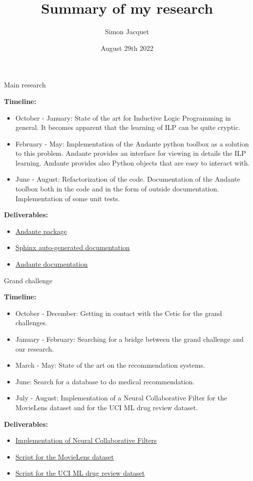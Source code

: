\documentclass{beamer}
\title{Summary of my research}
\author{Simon Jacquet}
\date{August 29th 2022}
\begin{document}
\frame{\titlepage}

\begin{frame}{Main research}

\textbf{Timeline:}
\begin{itemize}
\item October - January: State of the art for Inductive Logic Programming in
general. It becomes apparent that the learning of ILP can be quite cryptic.
\item February - May: Implementation of the Andante python toolbox as a
solution to this problem. Andante provides an interface for viewing in details
the ILP learning. Andante provides also Python objects that are easy to
interact with. 
\item June - August: Refactorization of the code. Documentation of the Andante
toolbox both in the code and in the form of outside documentation.
Implementation of some unit tests.
\end{itemize}

\textbf{Deliverables:}
\begin{itemize}
\item \href{https://gitlab.unamur.be/sijacque/andante/-/tree/master/src}{Andante package}
\item \href{https://gitlab.unamur.be/sijacque/andante/-/tree/master/docs}{Sphinx auto-generated documentation}
\item \href{https://gitlab.unamur.be/sijacque/andante-documentation}{Andante documentation}
\end{itemize}
\end{frame}

\begin{frame}{Grand challenge}

\textbf{Timeline:}
\begin{itemize}
\item October - December: Getting in contact with the Cetic for the grand
    challenges.
\item January - February: Searching for a bridge between the grand challenge
    and our research.
\item March - May: State of the art on the recommendation systems.
\item June: Search for a database to do medical recommendation.
\item July - August: Implementation of a Neural Collaborative Filter for the
    MovieLens dataset and for the UCI ML drug review dataset.
\end{itemize}

\textbf{Deliverables:}
\begin{itemize}
\item \href{https://gitlab.unamur.be/sijacque/fl-ncf/-/tree/master/src}{Implementation of Neural Collaborative Filters}
\item \href{https://gitlab.unamur.be/sijacque/fl-ncf/-/blob/master/src/MovieLens.sync.ipynb}{Script for the MovieLens dataset}
\item \href{https://gitlab.unamur.be/sijacque/fl-ncf/-/blob/master/src/UCI_ML.sync.ipynb}{Script for the UCI ML drug review dataset}
\end{itemize}

\end{frame}
\end{document}
